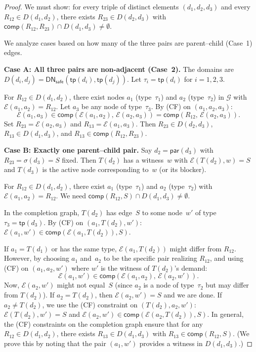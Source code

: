 \documentclass[a4paper,11pt]{article}
\theoremstyle{definition}
\newcommand{\comp}{\ensuremath{\mathsf{comp}}}
\newcommand{\DN}{\ensuremath{\mathsf{DN}}}
\begin{document}
\begin{proof}
We must show: for every triple of distinct elements $(d_1, d_2, d_3)$
and every $R_{12} \in D(d_1, d_2)$, there exists $R_{23} \in D(d_2,
d_3)$ with $\comp(R_{12}, R_{23}) \cap D(d_1, d_3) \neq \emptyset$.

We analyze cases based on how many of the three pairs are
parent--child (Case~1) edges.

\medskip
\noindent\textbf{Case A: All three pairs are non-adjacent
(Case~2).}\;
The domains are $D(d_i, d_j) = \DN_{\mathsf{safe}}(\mathsf{tp}(d_i),
\mathsf{tp}(d_j))$.  Let $\tau_i = \mathsf{tp}(d_i)$ for $i = 1,2,3$.

For $R_{12} \in D(d_1, d_2)$, there exist nodes $a_1$ (type~$\tau_1$)
and $a_2$ (type~$\tau_2$) in $\mathcal{G}$ with $\mathcal{E}(a_1,
a_2) = R_{12}$.  Let $a_3$ be any node of type~$\tau_3$.  By (CF) on
$(a_1, a_2, a_3)$:
\[
  \mathcal{E}(a_1, a_3) \in \comp(\mathcal{E}(a_1, a_2),\,
    \mathcal{E}(a_2, a_3)) = \comp(R_{12},\, \mathcal{E}(a_2, a_3)).
\]
Set $R_{23} = \mathcal{E}(a_2, a_3)$ and $R_{13} = \mathcal{E}(a_1,
a_3)$.  Then $R_{23} \in D(d_2, d_3)$, $R_{13} \in D(d_1, d_3)$,
and $R_{13} \in \comp(R_{12}, R_{23})$.

\medskip
\noindent\textbf{Case B: Exactly one parent--child pair.}\;
Say $d_2 = \mathsf{par}(d_3)$ with $R_{23} = \sigma(d_3) = S$ fixed.
Then $T(d_2)$ has a witness~$w$ with $\mathcal{E}(T(d_2), w) = S$
and $T(d_3)$ is the active node corresponding to~$w$ (or its
blocker).

For $R_{12} \in D(d_1, d_2)$, there exist $a_1$ (type~$\tau_1$) and
$a_2$ (type~$\tau_2$) with $\mathcal{E}(a_1, a_2) = R_{12}$.  We
need $\comp(R_{12}, S) \cap D(d_1, d_3) \neq \emptyset$.

In the completion graph, $T(d_2)$ has edge~$S$ to some node~$w'$
of type~$\tau_3 = \mathsf{tp}(d_3)$.  By (CF) on $(a_1, T(d_2), w')$:
$\mathcal{E}(a_1, w') \in \comp(\mathcal{E}(a_1, T(d_2)), S)$.

If $a_1 = T(d_1)$ or has the same type, $\mathcal{E}(a_1, T(d_2))$
might differ from $R_{12}$.  However, by choosing $a_1$ and~$a_2$ to
be the specific pair realizing $R_{12}$, and using (CF) on $(a_1, a_2,
w')$ where $w'$ is the witness of $T(d_2)$'s demand:
\[
  \mathcal{E}(a_1, w') \in \comp(\mathcal{E}(a_1, a_2),\,
    \mathcal{E}(a_2, w')).
\]
Now, $\mathcal{E}(a_2, w')$ might not equal~$S$ (since $a_2$ is a
node of type~$\tau_2$ but may differ from $T(d_2)$).  If $a_2 =
T(d_2)$, then $\mathcal{E}(a_2, w') = S$ and we are done.  If $a_2
\neq T(d_2)$, we use the (CF) constraint on $(T(d_2), a_2, w')$:
$\mathcal{E}(T(d_2), w') = S$ and
$\mathcal{E}(a_2, w') \in \comp(\mathcal{E}(a_2, T(d_2)),
S)$.  In general, the (CF) constraints on the completion graph
ensure that for any $R_{12} \in D(d_1, d_2)$, there exists
$R_{13} \in D(d_1, d_3)$ with $R_{13} \in \comp(R_{12}, S)$.
(We prove this by noting that the pair $(a_1, w')$ provides a witness
in $D(d_1, d_3)$.)


\end{proof}
\end{document}
